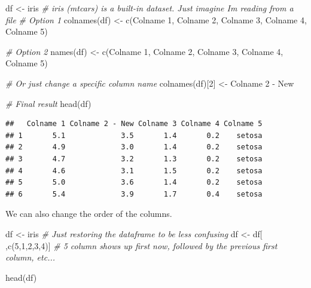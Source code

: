 \documentclass[
]{book}
\newenvironment{Shaded}{\begin{snugshade}}{\end{snugshade}}
\newcommand{\CommentTok}[1]{\textcolor[rgb]{0.56,0.35,0.01}{\textit{#1}}}
\newcommand{\DecValTok}[1]{\textcolor[rgb]{0.00,0.00,0.81}{#1}}
\newcommand{\FunctionTok}[1]{\textcolor[rgb]{0.00,0.00,0.00}{#1}}
\newcommand{\NormalTok}[1]{#1}
\newcommand{\OtherTok}[1]{\textcolor[rgb]{0.56,0.35,0.01}{#1}}
\newcommand{\StringTok}[1]{\textcolor[rgb]{0.31,0.60,0.02}{#1}}
\begin{document}
\begin{Shaded}
\begin{Highlighting}[]
\NormalTok{df }\OtherTok{\textless{}{-}}\NormalTok{ iris  }\CommentTok{\# iris (mtcars) is a built{-}in dataset. Just imagine I\textquotesingle{}m reading from a file}
\CommentTok{\# Option 1}
\FunctionTok{colnames}\NormalTok{(df) }\OtherTok{\textless{}{-}} \FunctionTok{c}\NormalTok{(}\StringTok{\textquotesingle{}Colname 1\textquotesingle{}}\NormalTok{, }\StringTok{\textquotesingle{}Colname 2\textquotesingle{}}\NormalTok{, }\StringTok{\textquotesingle{}Colname 3\textquotesingle{}}\NormalTok{, }\StringTok{\textquotesingle{}Colname 4\textquotesingle{}}\NormalTok{, }\StringTok{\textquotesingle{}Colname 5\textquotesingle{}}\NormalTok{)}

\CommentTok{\# Option 2}
\FunctionTok{names}\NormalTok{(df) }\OtherTok{\textless{}{-}} \FunctionTok{c}\NormalTok{(}\StringTok{\textquotesingle{}Colname 1\textquotesingle{}}\NormalTok{, }\StringTok{\textquotesingle{}Colname 2\textquotesingle{}}\NormalTok{, }\StringTok{\textquotesingle{}Colname 3\textquotesingle{}}\NormalTok{, }\StringTok{\textquotesingle{}Colname 4\textquotesingle{}}\NormalTok{, }\StringTok{\textquotesingle{}Colname 5\textquotesingle{}}\NormalTok{)}

\CommentTok{\# Or just change a specific column name}
\FunctionTok{colnames}\NormalTok{(df)[}\DecValTok{2}\NormalTok{] }\OtherTok{\textless{}{-}} \StringTok{\textquotesingle{}Colname 2 {-} New\textquotesingle{}}

\CommentTok{\# Final result}
\FunctionTok{head}\NormalTok{(df)}
\end{Highlighting}
\end{Shaded}

\begin{verbatim}
##   Colname 1 Colname 2 - New Colname 3 Colname 4 Colname 5
## 1       5.1             3.5       1.4       0.2    setosa
## 2       4.9             3.0       1.4       0.2    setosa
## 3       4.7             3.2       1.3       0.2    setosa
## 4       4.6             3.1       1.5       0.2    setosa
## 5       5.0             3.6       1.4       0.2    setosa
## 6       5.4             3.9       1.7       0.4    setosa
\end{verbatim}

We can also change the order of the columns.

\begin{Shaded}
\begin{Highlighting}[]
\NormalTok{df }\OtherTok{\textless{}{-}}\NormalTok{ iris }\CommentTok{\# Just restoring the dataframe to be less confusing}
\NormalTok{df }\OtherTok{\textless{}{-}}\NormalTok{ df[ ,}\FunctionTok{c}\NormalTok{(}\DecValTok{5}\NormalTok{,}\DecValTok{1}\NormalTok{,}\DecValTok{2}\NormalTok{,}\DecValTok{3}\NormalTok{,}\DecValTok{4}\NormalTok{)]  }\CommentTok{\# 5 column shows up first now, followed by the previous first column, etc...}

\FunctionTok{head}\NormalTok{(df)}
\end{Highlighting}
\end{Shaded}
\end{document}
